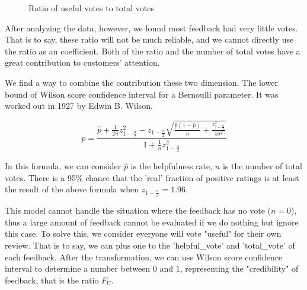 \documentclass{mcmthesis}
\begin{document}
\begin{figure}[ht]
    \caption{Ratio of useful votes to total votes}
    \label{fig:ratio_useful}
\end{figure}

After analyzing the data, however, we found most feedback had very little votes. That is to say, these ratio will not be much reliable, and we cannot directly use the ratio as an coefficient. Both of the ratio and the number of total votes have a great contribution to customers' attention.

We find a way to combine the contribution these two dimension. The lower bound of Wilson score confidence interval for a Bernoulli parameter. It was worked out in 1927 by Edwin B. Wilson. \cite{ref:wilson}

$$
p = \frac{\widehat{p}+\frac{1}{2 n} z_{1-\frac{\alpha}{2}}^{2}  - z_{1-\frac{\alpha}{2}} \sqrt{\frac{\widehat{p}(1-\widehat{p})}{n}+\frac{z^2_{1-\frac{\alpha}{2}}}{4 n^{2}}}}{1+\frac{1}{n} z_{1-\frac{\alpha}{2}}^{2}}
$$

In this formula, we can consider $\hat{p}$ is the helpfulness rate, $n$ is the number of total votes. There is a 95\% chance that the 'real' fraction of positive ratings is at least the result of the above formula when $z_{1-\frac{\alpha}{2}} = 1.96$.

This model cannot handle the situation where the feedback has no vote ($n=0$), thus a large amount of feedback cannot be evaluated if we do nothing but ignore this case. To solve this, we consider everyone will vote "useful" for their own review.  That is to say, we can plus one to the 'helpful\_vote' and 'total\_vote' of each feedback. After the transformation, we can use Wilson score confidence interval to determine a number between $0$ and $1$, representing the "credibility" of feedback, that is the ratio $F_U$.
\end{document}
